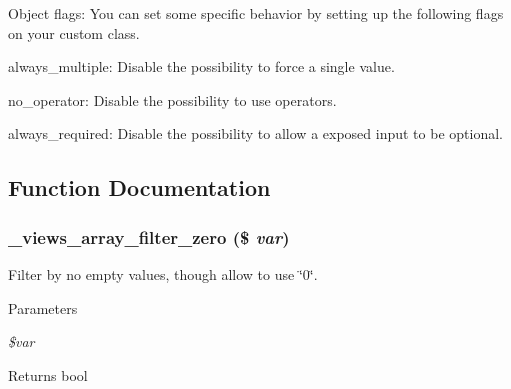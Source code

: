 Object flags: You can set some specific behavior by setting up the following flags on your custom class.


\begin{DoxyItemize}
\item always\_\-multiple: Disable the possibility to force a single value.
\item no\_\-operator: Disable the possibility to use operators.
\item always\_\-required: Disable the possibility to allow a exposed input to be optional. 
\end{DoxyItemize}

\subsection{Function Documentation}
\hypertarget{group__views__filter__handlers_ga4877cb7e6a7e3cda21438608fa979cbb}{
\subsubsection[{\_\-views\_\-array\_\-filter\_\-zero}]{\setlength{\rightskip}{0pt plus 5cm}\_\-views\_\-array\_\-filter\_\-zero (\$ {\em var})}}
\label{group__views__filter__handlers_ga4877cb7e6a7e3cda21438608fa979cbb}
Filter by no empty values, though allow to use \char`\"{}0\char`\"{}. 
\begin{DoxyParams}{Parameters}
\item[{\em \$var}]\end{DoxyParams}
\begin{DoxyReturn}{Returns}
bool 
\end{DoxyReturn}
